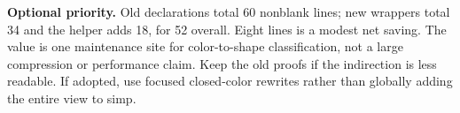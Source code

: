 \textbf{Optional priority.} Old declarations total 60 nonblank lines;
new wrappers total 34 and the helper adds 18, for 52 overall. Eight lines is
a modest net saving. The value is one maintenance site for color-to-shape
classification, not a large compression or performance claim. Keep the
old proofs if the indirection is less readable. If adopted, use focused
closed-color rewrites rather than globally adding the entire view to simp.
